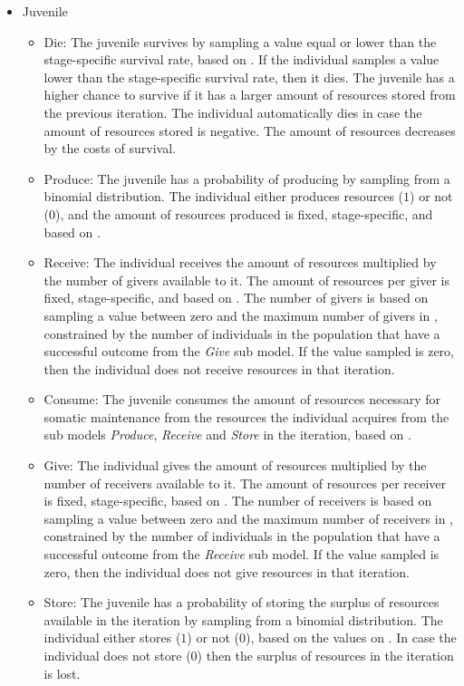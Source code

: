 \documentclass{article}
\begin{document}
\begin{itemize}
    \item Juvenile
    \begin{itemize}
        \item Die: The juvenile survives by sampling a value equal or lower than the stage-specific survival rate, based on \cite{gurven2007longevity}. If the individual samples a value lower than the stage-specific survival rate, then it dies. The juvenile has a higher chance to survive if it has a larger amount of resources stored from the previous iteration. The individual automatically dies in case the amount of resources stored is negative. The amount of resources decreases by the costs of survival.
        \item Produce: The juvenile has a probability of producing by sampling from a binomial distribution. The individual either produces resources ($1$) or not ($0$), and the amount of resources produced is fixed, stage-specific, and based on \cite{koster2020life}.
        \item Receive: The individual receives the amount of resources multiplied by the number of givers available to it. The amount of resources per giver is fixed, stage-specific, and based on \cite{gurven2004give}. The number of givers is based on sampling a value between zero and the maximum number of givers in \cite{gurven2004give}, constrained by the number of individuals in the population that have a successful outcome from the \emph{Give} sub model. If the value sampled is zero, then the individual does not receive resources in that iteration.
        \item Consume: The juvenile consumes the amount of resources necessary for somatic maintenance from the resources the individual acquires from the sub models \emph{Produce}, \emph{Receive} and \emph{Store} in the iteration, based on \cite{kaplan2000theory, pontzer2021daily}.
        \item Give: The individual gives the amount of resources multiplied by the number of receivers available to it. The amount of resources per receiver is fixed, stage-specific, based on \cite{gurven2004give}. The number of receivers is based on sampling a value between zero and the maximum number of receivers in \cite{gurven2004give}, constrained by the number of individuals in the population that have a successful outcome from the \emph{Receive} sub model. If the value sampled is zero, then the individual does not give resources in that iteration.
        \item Store: The juvenile has a probability of storing the surplus of resources available in the iteration by sampling from a binomial distribution. The individual either stores ($1$) or not ($0$), based on the values on \citep{bowles2011cultivation}. In case the individual does not store ($0$) then the surplus of resources in the iteration is lost.

\end{itemize}
\end{itemize}
\end{document}

